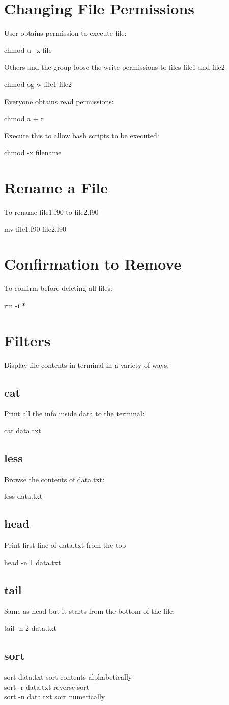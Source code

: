\documentclass[10pt]{article}
\newcommand{\bt}{\begin{tcolorbox}}
\newcommand{\et}{\end{tcolorbox}}
\begin{document}
\section{Changing File Permissions}
User obtains permission to execute file:
  \bt
   chmod u+x file
  \et
Others and the group loose the write permissions to files file1 and file2
  \bt
   chmod og-w file1 file2
  \et
Everyone obtains read permissions:
  \bt
   chmod a + r
  \et
Execute this to allow bash scripts to be executed:
	\bt
	chmod -x filename
	\et
\section{Rename a File}
To rename file1.f90 to file2.f90
\bt
mv file1.f90 file2.f90
\et

\section{Confirmation to Remove}
To confirm before deleting all files:
\bt
rm -i *
\et

\section{Filters}
Display file contents in terminal in a variety of ways:
   \subsection{cat}
   Print all the info inside data to the terminal:
     \bt
     cat data.txt
     \et

  \subsection{less}
  Browse the contents of data.txt:
  \bt
  less data.txt
  \et

  \subsection{head}
  Print first line of data.txt from the top
  \bt
  head -n 1 data.txt
  \et

  \subsection{tail}
  Same as head but it starts from the bottom of the file:
  \bt
  tail -n 2 data.txt
  \et

  \subsection{sort}
  \bt
  sort data.txt \qquad sort contents alphabetically\\
  sort -r data.txt \quad reverse sort\\
  sort -n data.txt \quad sort numerically
  \et
  
\end{document}
